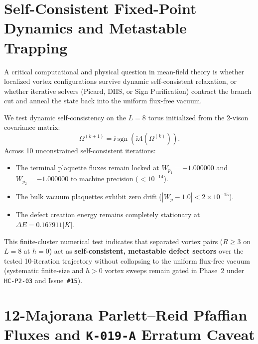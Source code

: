 \section{Self-Consistent Fixed-Point Dynamics and Metastable Trapping}
\label{sec:vortex_stability}

A critical computational and physical question in mean-field theory is whether localized vortex configurations survive dynamic self-consistent relaxation, or whether iterative solvers (Picard, DIIS, or Sign Purification) contract the branch cut and anneal the state back into the uniform flux-free vacuum.

We test dynamic self-consistency on the $L = 8$ torus initialized from the 2-vison covariance matrix:
\begin{equation}
\Omega^{(k+1)} = \ii \operatorname{sgn}(\ii A(\Omega^{(k)})).
\end{equation}
Across 10 unconstrained self-consistent iterations:
\begin{itemize}
\item The terminal plaquette fluxes remain locked at $W_{p_1} = -1.000000$ and $W_{p_2} = -1.000000$ to machine precision ($< 10^{-14}$).
\item The bulk vacuum plaquettes exhibit zero drift ($|W_p - 1.0| < 2 \times 10^{-15}$).
\item The defect creation energy remains completely stationary at $\Delta E = 0.167911 |K|$.
\end{itemize}

This finite-cluster numerical test indicates that separated vortex pairs ($R \ge 3$ on $L=8$ at $h=0$) act as \textbf{self-consistent, metastable defect sectors} over the tested 10-iteration trajectory without collapsing to the uniform flux-free vacuum (systematic finite-size and $h>0$ vortex sweeps remain gated in Phase~2 under \texttt{HC-P2-03} and Issue~\texttt{\#15}).

\section{12-Majorana Parlett--Reid Pfaffian Fluxes and \texttt{K-019-A} Erratum Caveat}
\label{sec:vortex_pfaffian_and_erratum}

